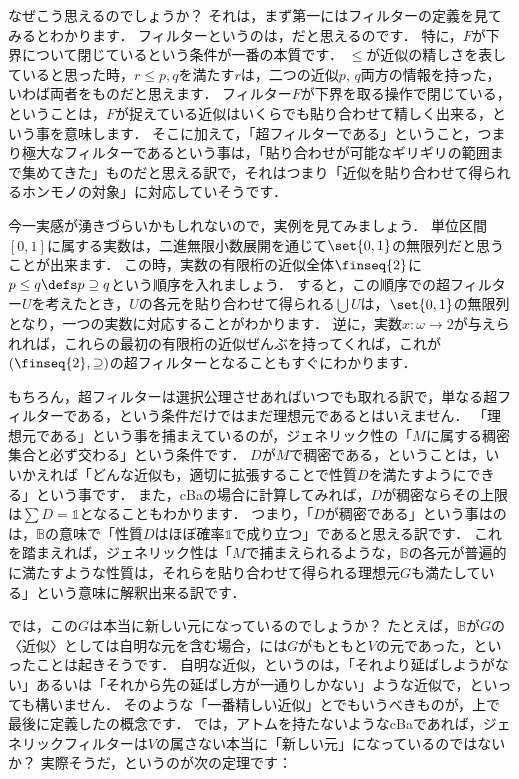 \documentclass[a4j]{ltjsarticle}
\renewcommand{\emph}[1]{\textbf{\textgt{#1}}}
\begin{document}
なぜこう思えるのでしょうか？
それは，まず第一にはフィルターの定義を見てみるとわかります．
フィルターというのは，\emph{貼り合わせられる近似の集合}だと思えるのです．
特に，$F$が下界について閉じているという条件が一番の本質です．
$\leq$が近似の精しさを表していると思った時，$r \leq p, q$を満たす$r$は，二つの近似$p$, $q$両方の情報を持った，いわば両者を\emph{貼り合わせた}ものだと思えます．
フィルター$F$が下界を取る操作で閉じている，ということは，$F$が捉えている近似はいくらでも貼り合わせて精しく出来る，という事を意味します．
そこに加えて，「超フィルターである」ということ，つまり極大なフィルターであるという事は，「貼り合わせが可能なギリギリの範囲まで集めてきた」ものだと思える訳で，それはつまり「近似を貼り合わせて得られるホンモノの対象」に対応していそうです．

今一実感が湧きづらいかもしれないので，実例を見てみましょう．
単位区間$[0,1]$に属する実数は，二進無限小数展開を通じて$\set{0, 1}$の無限列だと思うことが出来ます．
この時，実数の有限桁の近似全体$\finseq{2}$に$p \leq q \defs p \supseteq q$という順序を入れましょう．
すると，この順序での超フィルター$U$を考えたとき，$U$の各元を貼り合わせて得られる$\bigcup U$は，$\set{0, 1}$の無限列となり，一つの実数に対応することがわかります．
逆に，実数$x : \omega \to 2$が与えられれば，これらの最初の有限桁の近似ぜんぶを持ってくれば，これが$(\finseq{2}, \supseteq)$の超フィルターとなることもすぐにわかります．

もちろん，超フィルターは選択公理させあればいつでも取れる訳で，単なる超フィルターである，という条件だけではまだ理想元であるとはいえません．
「理想元である」という事を捕まえているのが，ジェネリック性の「$M$に属する稠密集合と必ず交わる」という条件です．
$D$が$M$で稠密である，ということは，いいかえれば「どんな近似も，適切に拡張することで性質$D$を満たすようにできる」という事です．
また，cBaの場合に計算してみれば，$D$が稠密ならその上限は$\sum D = \mathds{1}$となることもわかります．
つまり，「$D$が稠密である」という事はのは，$\mathbb{B}$の意味で「性質$D$はほぼ確率$\mathds{1}$で成り立つ」であると思える訳です．
これを踏まえれば，ジェネリック性は「$M$で捕まえられるような，$\mathbb{B}$の各元が普遍的に満たすような性質は，それらを貼り合わせて得られる理想元$G$も満たしている」という意味に解釈出来る訳です．

では，この$G$は本当に新しい元になっているのでしょうか？
たとえば，$\mathbb{B}$が$G$の〈近似〉としては自明な元を含む場合，には$G$がもともと$V$の元であった，といったことは起きそうです．
自明な近似，というのは，「それより延ばしようがない」あるいは「それから先の延ばし方が一通りしかない」ような近似で，といっても構いません．
そのような「一番精しい近似」とでもいうべきものが，上で最後に定義した\emph{アトム}の概念です．
では，アトムを持たないようなcBaであれば，ジェネリックフィルターは$V$の属さない本当に「新しい元」になっているのではないか？
実際そうだ，というのが次の定理です：
\end{document}

